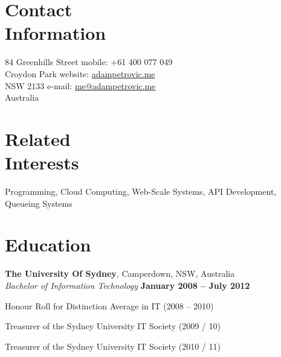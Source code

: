\documentclass[margin,line]{resume}
\begin{document}
\vspace{2mm}
\begin{resume}

    \section{\mysidestyle Contact\\Information}

    84 Greenhills Street	                            \hfill mobile: +61 400 077 049          \vspace{0mm}\\\vspace{0mm}%
    Croydon Park					    \hfill website: \href{http://www.adampetrovic.me}{adampetrovic.me}		\vspace{0mm}\\\vspace{0mm}%
    NSW 2133						    \hfill e-mail: \href{mailto:me@adampetrovic.me}{me@adampetrovic.me}	  \vspace{0mm}\\\vspace{-4.5mm}%
    Australia				
    \vspace{2mm}

    \section{\mysidestyle Related\\Interests}

    Programming, Cloud Computing, Web-Scale Systems, API Development, Queueing Systems


    \section{\mysidestyle Education}

    \textbf{The University Of Sydney}, Camperdown, NSW, Australia \vspace{2mm}\\\vspace{1mm}%
    \textsl{Bachelor of Information Technology} \hfill \textbf{January 2008 -- July 2012}\vspace{-3mm}\\\vspace{-1mm}%
     \begin{list2}
	\item Honour Roll for Distinction Average in IT (2008 -- 2010)
	\item Treasurer of the Sydney University IT Society (2009 / 10)
	\item Treasurer of the Sydney University IT Society (2010 / 11)
     \end{list2}\vspace{-1.5mm}


\end{resume}
\end{document}
